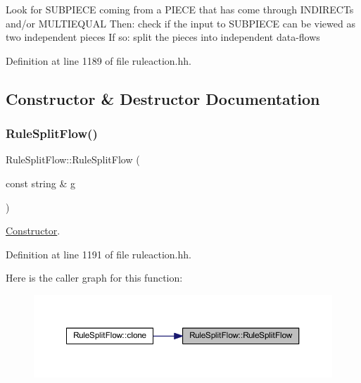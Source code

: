 Look for S\+U\+B\+P\+I\+E\+CE coming from a P\+I\+E\+CE that has come through I\+N\+D\+I\+R\+E\+C\+Ts and/or M\+U\+L\+T\+I\+E\+Q\+U\+AL Then\+: check if the input to S\+U\+B\+P\+I\+E\+CE can be viewed as two independent pieces If so\+: split the pieces into independent data-\/flows 

Definition at line 1189 of file ruleaction.\+hh.



\subsection{Constructor \& Destructor Documentation}
\mbox{\label{class_rule_split_flow_a2ad3e774bee151873b79dafdefbcf25b}} 
\subsubsection{\texorpdfstring{RuleSplitFlow()}{RuleSplitFlow()}}
{\footnotesize\ttfamily Rule\+Split\+Flow\+::\+Rule\+Split\+Flow (\begin{DoxyParamCaption}\item[{const string \&}]{g }\end{DoxyParamCaption})\hspace{0.3cm}{\ttfamily [inline]}}



\mbox{\hyperlink{class_constructor}{Constructor}}. 



Definition at line 1191 of file ruleaction.\+hh.

Here is the caller graph for this function\+:
\nopagebreak
\begin{figure}[H]
\begin{center}
\leavevmode
\includegraphics[width=350pt]{class_rule_split_flow_a2ad3e774bee151873b79dafdefbcf25b_icgraph}
\end{center}
\end{figure}



